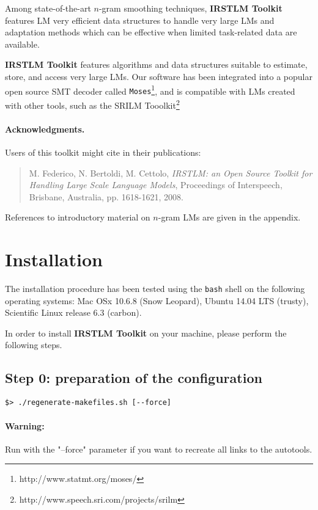 \documentclass[11pt]{article}
\newcommand{\IRSTLM}{{\bf IRSTLM Toolkit}}
\newcommand{\IMPORTANT}[1]{\begin{mdframed}[linecolor=red]\noindent #1\end{mdframed}}
\newcommand{\WARNING}[1]{\paragraph{Warning:} #1}
\begin{document}
\noindent
Among  state-of-the-art  $n$-gram  smoothing  techniques, {\IRSTLM} features LM  very efficient 
data structures to handle very large LMs and adaptation  methods which  can  be effective when limited task-related  data are available. 

{\IRSTLM} features algorithms and data structures suitable to estimate, 
store, and access very  large LMs.  Our software has been integrated into a popular open source 
SMT decoder  called {\tt Moses}\footnote{http://www.statmt.org/moses/}, and is compatible with LMs
created with other tools, such as the SRILM Tooolkit\footnote{http://www.speech.sri.com/projects/srilm}


\paragraph{Acknowledgments.}Users of this toolkit  might cite in their publications:
\begin{quote}
M. Federico,  N. Bertoldi,  M. Cettolo, {\em IRSTLM: an Open Source Toolkit for Handling Large Scale Language Models}, Proceedings of Interspeech, Brisbane, Australia, pp. 1618-1621, 2008.
\end{quote}

\noindent
References to introductory material on $n$-gram LMs are given in the appendix. 


\newpage
\section{Installation}
\label{sec:installation}

\IMPORTANT{The installation procedure has been tested using the {\tt bash} shell on the following operating systems: Mac OSx 10.6.8 (Snow Leopard), Ubuntu 14.04 LTS (trusty), Scientific Linux release 6.3 (carbon).}

\noindent In order to install {\IRSTLM} on your machine, please perform the following steps.


\subsection{Step 0: preparation of the configuration}
\begin{verbatim}
$> ./regenerate-makefiles.sh [--force]
\end{verbatim}

\WARNING{Run with the "--force" parameter if you want to recreate all links to the autotools.}
\end{document}
